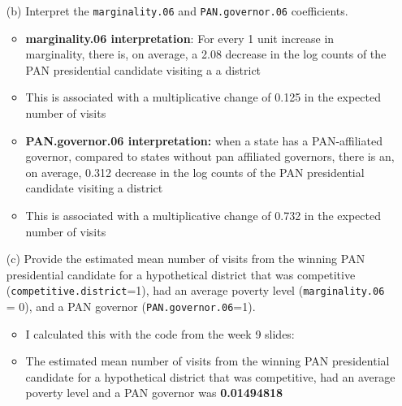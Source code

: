 \documentclass[12pt,letterpaper]{article}
\begin{document}
\begin{enumerate}
	\item [(b)]
	Interpret the \texttt{marginality.06} and \texttt{PAN.governor.06} coefficients.
		\begin{itemize}
			\item \textbf{marginality.06 interpretation}: For every 1 unit increase in marginality, there is, on average, a 2.08 decrease in the log counts of the PAN presidential candidate visiting a a district
			\item This is associated with a multiplicative change of 0.125 in the expected number of visits
			\item \textbf{PAN.governor.06 interpretation:} when a state has a PAN-affiliated governor, compared to states without pan affiliated governors, there is an, on average, 0.312 decrease in the log counts of the PAN presidential candidate visiting a district
			\item This is associated with a multiplicative change of 0.732 in the expected number of visits
		\end{itemize}
	
	\item [(c)]
	Provide the estimated mean number of visits from the winning PAN presidential candidate for a hypothetical district that was competitive (\texttt{competitive.district}=1), had an average poverty level (\texttt{marginality.06} = 0), and a PAN governor (\texttt{PAN.governor.06}=1).
		\begin{itemize}
			\item I calculated this with the code from the week 9 slides:
			
			\item The estimated mean number of visits from the winning PAN presidential candidate for a hypothetical district that was competitive, had an average poverty level and a PAN governor was \textbf{0.01494818}
			
		\end{itemize}
	
\end{enumerate}
\end{document}
